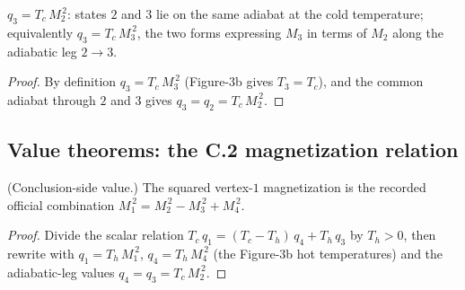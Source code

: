 \begin{lemma}
\label{lem:IPhO2026Problems_problem_IPhO_2026_3_C_2:q3_eq}
$q_3 = T_c\,M_2^{\,2}$: states $2$ and $3$ lie on the same adiabat at
the cold temperature; equivalently $q_3 = T_c\,M_3^{\,2}$, the two
forms expressing $M_3$ in terms of $M_2$ along the adiabatic leg
$2 \to 3$.
\end{lemma}
\begin{proof}
By definition $q_3 = T_c\,M_3^{\,2}$ (Figure-3b gives
$T_3 = T_c$), and the common adiabat through $2$ and $3$ gives
$q_3 = q_2 = T_c\,M_2^{\,2}$.
\end{proof}

\subsection*{Value theorems: the C.2 magnetization relation}

\begin{theorem}
\label{thm:IPhO2026Problems_problem_IPhO_2026_3_C_2:m1_sq}
(Conclusion-side value.) The squared vertex-$1$ magnetization is the
recorded official combination
$M_1^{\,2} = M_2^{\,2} - M_3^{\,2} + M_4^{\,2}$.
\end{theorem}
\begin{proof}
Divide the scalar relation
$T_c\,q_1 = (T_c - T_h)\,q_4 + T_h\,q_3$ by $T_h > 0$, then rewrite
with $q_1 = T_h\,M_1^{\,2}$, $q_4 = T_h\,M_4^{\,2}$ (the Figure-3b
hot temperatures) and the adiabatic-leg values
$q_4 = q_3 = T_c\,M_2^{\,2}$.
\end{proof}

